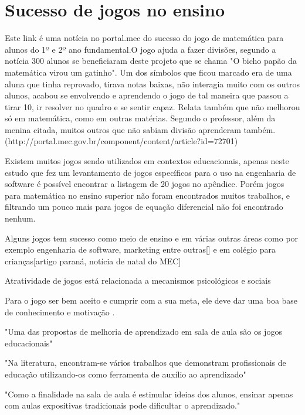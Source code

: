 \section[Sucesso de jogos no ensino]{Sucesso de jogos no ensino}

Este link é uma notícia no portal.mec do sucesso do jogo de matemática para alunos do 1º e 2º ano fundamental.O jogo ajuda a fazer divisões, segundo a notícia 300 alunos se beneficiaram deste projeto que se chama "O bicho papão da matemática virou um gatinho". Um dos símbolos que ficou marcado era de uma aluna que tinha reprovado, tirava notas baixas, não interagia muito com os outros alunos, acabou se envolvendo e aprendendo o jogo de tal maneira que passou a tirar 10, ir resolver no quadro e se sentir capaz. Relata também que não melhorou só em matemática, como em outras matérias. Segundo o professor, além da menina citada, muitos outros que não sabiam divisão aprenderam também. (http://portal.mec.gov.br/component/content/article?id=72701)

Existem muitos jogos sendo utilizados em contextos educacionais, apenas neste estudo \cite{sucessoJogoEngSoft} que fez um levantamento de jogos específicos para o uso na engenharia de software é possível encontrar a listagem de 20 jogos no apêndice. Porém jogos para matemática no ensino superior não foram encontrados muitos trabalhos, e filtrando um pouco mais para jogos de equação diferencial não foi encontrado nenhum.


Alguns jogos tem sucesso como meio de ensino e em várias outras áreas como por exemplo engenharia de software, marketing entre outras[] e em colégio para crianças[artigo paraná, notícia de natal do MEC]

Atratividade de jogos está relacionada a mecanismos psicológicos e sociais \cite{sucessoJogoEngSoft}

Para o jogo ser bem aceito e cumprir com a sua meta, ele deve dar uma boa base de conhecimento e motivação \cite{sucessoJogoEngSoft}.

"Uma das propostas de melhoria de aprendizado em sala de aula são os jogos educacionais" \cite[p. 4]{sucessoJogoEngSoft}

"Na literatura, encontram-se vários trabalhos que demonstram profissionais de educação utilizando-os como ferramenta de auxílio ao aprendizado" \cite[p. 3]{sucessoJogoEngSoft}

"Como a finalidade na sala de aula é estimular ideias dos alunos, ensinar apenas com aulas expositivas
tradicionais pode dificultar o aprendizado." \cite[p. 4]{sucessoJogoEngSoft} 

